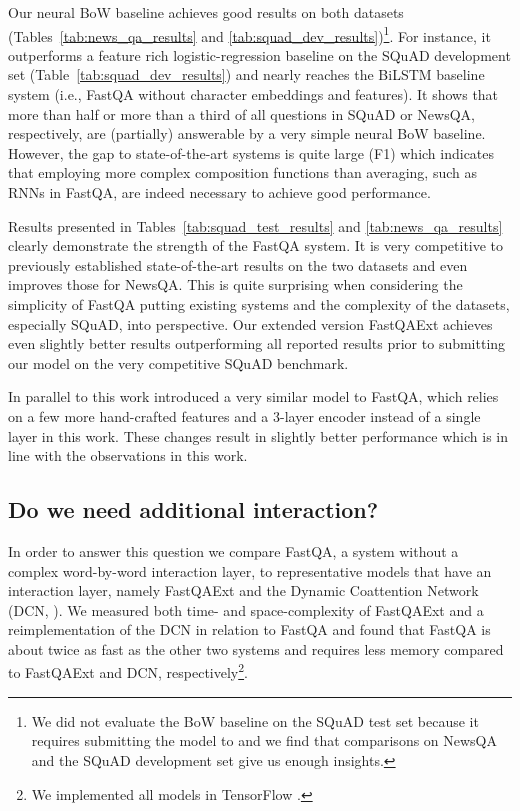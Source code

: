 \documentclass[11pt,a4paper]{article}
\begin{document}
Our neural BoW baseline achieves good results on both datasets (Tables~\ref{tab:news_qa_results} and \ref{tab:squad_dev_results})\footnote{We did not evaluate the BoW baseline on the SQuAD test set because it requires submitting the model to  and we find that comparisons on NewsQA and the SQuAD development set give us enough insights.}. For instance, it outperforms a feature rich logistic-regression baseline on the SQuAD development set (Table~\ref{tab:squad_dev_results}) and nearly reaches the BiLSTM baseline system (i.e., FastQA without character embeddings and features). It shows that more than half or more than a third of all questions in SQuAD or NewsQA, respectively, are (partially) answerable by a very simple neural BoW baseline. However, the gap to state-of-the-art systems is quite large (F1) which indicates that employing more complex composition functions than averaging, such as RNNs in FastQA, are indeed necessary to achieve good performance.

Results presented in Tables~\ref{tab:squad_test_results} and \ref{tab:news_qa_results} clearly demonstrate the strength of the FastQA system. It is very competitive to previously established state-of-the-art results on the two datasets and even improves those for NewsQA. This is quite surprising when considering the simplicity of FastQA putting existing systems and the complexity of the datasets, especially SQuAD, into perspective. Our extended version FastQAExt achieves even slightly better results outperforming all reported results prior to submitting our model on the very competitive SQuAD benchmark.

In parallel to this work  introduced a very similar model to FastQA, which relies on a few more hand-crafted features and a 3-layer encoder instead of a single layer in this work. These changes result in slightly better performance which is in line with the observations in this work. 

\subsection{Do we need additional interaction?}

In order to answer this question we compare FastQA, a system without a complex word-by-word interaction layer, to representative models that have an interaction layer, namely FastQAExt and the Dynamic Coattention Network (DCN, ). We measured both time- and space-complexity of FastQAExt and a reimplementation of the DCN in relation to FastQA and found that FastQA is about twice as fast as the other two systems and requires  less memory compared to FastQAExt and DCN, respectively\footnote{We implemented all models in TensorFlow \cite{Abadi2015}.}.
\end{document}
